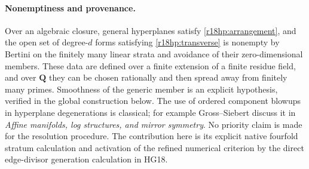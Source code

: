 \paragraph{Nonemptiness and provenance.}
Over an algebraic closure, general hyperplanes satisfy
\eqref{r18hp:arrangement}, and the open set of degree-$d$ forms
satisfying \eqref{r18hp:transverse} is nonempty by Bertini on the
finitely many linear strata and avoidance of their zero-dimensional
members.  These data are defined over a finite extension of a
finite residue field, and over $\mathbf Q$ they can be chosen
rationally and then spread away from finitely many primes.
Smoothness of the generic member is an explicit hypothesis,
verified in the global construction below.
The use of ordered component blowups in hyperplane degenerations
is classical; for example Gross--Siebert discuss it in
\emph{Affine manifolds, log structures, and mirror symmetry}.
No priority claim is made for the resolution procedure.
The contribution here is its explicit native fourfold stratum
calculation and activation of the refined numerical criterion
by the direct edge-divisor generation calculation in HG18.
